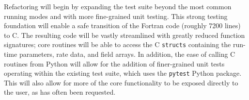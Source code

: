 Refactoring \grackle{} will begin by expanding the test suite beyond
the most common running modes and with more fine-grained unit testing.
This strong
testing foundation will enable a safe transition of the Fortran code (roughly
7200 lines) to C.  The resulting code will be vastly streamlined with greatly
reduced function signatures; core routines will be able to access the C
\texttt{structs} containing the run-time parameters, rate data, and field
arrays.  In addition, the ease of calling C routines from Python will allow for
the addition of finer-grained unit tests operating within the existing test
suite, which uses the \texttt{pytest} Python package.  This will also allow for
more of the core functionality to be exposed directly to the user, as has often
been requested.


